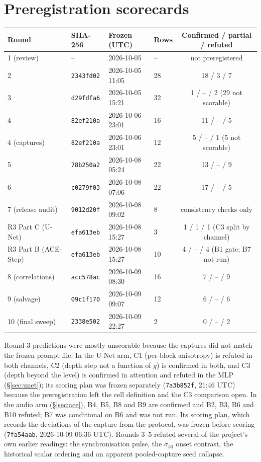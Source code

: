 \documentclass[11pt]{article}
\begin{document}
\section{Preregistration scorecards}\label{app:prereg}
\begin{table}[h]
\centering\small
\begin{tabular}{llllc}
\toprule
Round & SHA-256 & Frozen (UTC) & Rows & Confirmed / partial / refuted\\
\midrule
1 (review) & -- & 2026-10-05 & -- & not preregistered\\
2 & \texttt{2343fd02} & 2026-10-05 11:05 & 28 & 18 / 3 / 7\\
3 & \texttt{d29fdfa6} & 2026-10-05 15:21 & 32 & 1 / -- / 2 (29 not scorable)\\
4 & \texttt{82ef210a} & 2026-10-06 23:01 & 16 & 11 / -- / 5\\
4 (captures) & \texttt{82ef210a} & 2026-10-06 23:01 & 12 & 5 / -- / 1 (5 not scorable)\\
5 & \texttt{78b250a2} & 2026-10-08 05:24 & 22 & 13 / -- / 9\\
6 & \texttt{c0279f03} & 2026-10-08 07:06 & 22 & 17 / -- / 5\\
7 (release audit) & \texttt{9012d20f} & 2026-10-08 09:02 & 8 & consistency checks only\\
R3 Part C (U-Net) & \texttt{efa613eb} & 2026-10-08 15:27 & 3 & 1 / 1 / 1 (C3 split by channel)\\
R3 Part B (ACE-Step) & \texttt{efa613eb} & 2026-10-08 15:27 & 10 & 4 / -- / 4 (B1 gate; B7 not run)\\
8 (correlations) & \texttt{acc578ac} & 2026-10-09 08:30 & 16 & 7 / -- / 9\\
9 (salvage) & \texttt{09c1f170} & 2026-10-09 09:07 & 12 & 6 / -- / 6\\
10 (final sweep) & \texttt{2338e502} & 2026-10-09 22:27 & 2 & 0 / -- / 2\\
\bottomrule
\end{tabular}
\end{table}
Round 3 predictions were mostly unscorable because the captures did not match the frozen prompt file. In the U-Net arm, C1 (per-block anisotropy) is refuted in both channels, C2 (depth step not a function of $g$) is confirmed in both, and C3 (depth beyond the level) is confirmed in attention and refuted in the MLP (\S\ref{sec:unet}); its scoring plan was frozen separately (\texttt{7a3b852f}, 21:46 UTC) because the preregistration left the cell definition and the C3 comparison open. In the audio arm (\S\ref{sec:ace}), B4, B5, B8 and B9 are confirmed and B2, B3, B6 and B10 refuted; B7 was conditional on B6 and was not run. Its scoring plan, which records the deviations of the capture from the protocol, was frozen before scoring (\texttt{7fa54aab}, 2026-10-09 06:36 UTC). Rounds 3--5 refuted several of the project's own earlier readings: the synchronisation pulse, the $\sigma_{50}$ onset contrast, the historical scalar ordering and an apparent pooled-capture seed collapse.
\end{document}
